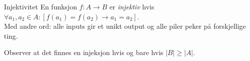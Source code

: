 \begin{frame}{Injektivitet}
En funksjon $f : A \rightarrow B$ er \emph{injektiv} hvis $\forall a_1, a_2 \in A : [f(a_1) = f(a_2) \rightarrow a_1 = a_2]$.\\
Med andre ord: alle inputs gir et unikt output og alle piler peker på forskjellige ting.
    \begin{figure}%
        \centering
        \qquad
        \qquad
        \label{fig:inj}%
    \end{figure}
    \pause
    Observer at det finnes en injeksjon hvis og bare hvis $|B| \geq |A|$.
\end{frame}

